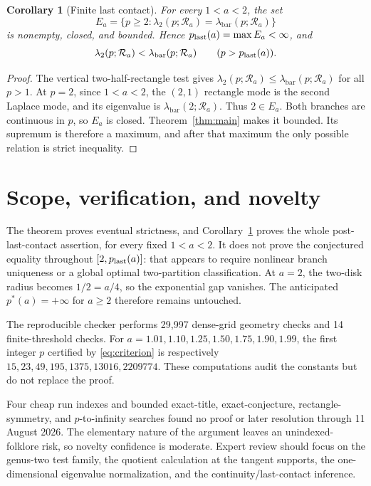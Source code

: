 \documentclass[11pt]{article}
\newtheorem{corollary}{Corollary}
\newcommand{\Ra}{\mathcal R_a}
\newcommand{\lbar}{\lambda_{\mathrm{bar}}}
\begin{document}
\begin{corollary}[Finite last contact]\label{cor:last}
For every \(1<a<2\), the set
\[
 E_a=\{p\ge2:\lambda_2(p;\Ra)=\lbar(p;\Ra)\}
\]
is nonempty, closed, and bounded. Hence
\(p_{\rm last}(a)=\max E_a<\infty\), and
\[
 \lambda_2(p;\Ra)<\lbar(p;\Ra)
 \qquad (p>p_{\rm last}(a)).
\]
\end{corollary}

\begin{proof}
The vertical two-half-rectangle test gives
\(\lambda_2(p;\Ra)\le\lbar(p;\Ra)\) for all \(p>1\). At \(p=2\), since
\(1<a<2\), the \((2,1)\) rectangle mode is the second Laplace mode, and its
eigenvalue is \(\lbar(2;\Ra)\). Thus \(2\in E_a\). Both branches are
continuous in \(p\), so \(E_a\) is closed. Theorem~\ref{thm:main} makes it
bounded. Its supremum is therefore a maximum, and after that maximum the
only possible relation is strict inequality.
\end{proof}

\section{Scope, verification, and novelty}

The theorem proves eventual strictness, and Corollary~\ref{cor:last} proves
the whole post-last-contact assertion, for every fixed \(1<a<2\). It does
not prove the conjectured equality throughout \([2,p_{\rm last}(a)]\): that
appears to require nonlinear branch uniqueness or a global optimal
two-partition classification. At \(a=2\), the two-disk radius becomes
\(1/2=a/4\), so the exponential gap vanishes. The anticipated
\(p^*(a)=+\infty\) for \(a\ge2\) therefore remains untouched.

The reproducible checker performs 29,997 dense-grid geometry checks and 14
finite-threshold checks. For \(a=1.01,1.10,1.25,1.50,1.75,1.90,1.99\), the
first integer \(p\) certified by \eqref{eq:criterion} is respectively
\(15,23,49,195,1375,13016,2209774\). These computations audit the constants
but do not replace the proof.

Four cheap run indexes and bounded exact-title, exact-conjecture,
rectangle-symmetry, and \(p\)-to-infinity searches found no proof or later
resolution through 11 August 2026. The elementary nature of the argument
leaves an unindexed-folklore risk, so novelty confidence is moderate. Expert
review should focus on the genus-two test family, the quotient calculation
at the tangent supports, the one-dimensional eigenvalue normalization, and
the continuity/last-contact inference.
\end{document}
